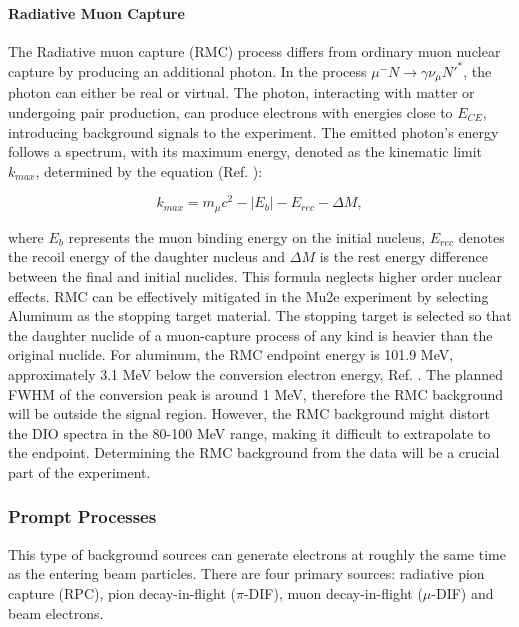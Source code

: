 \paragraph{Radiative Muon Capture}

The Radiative muon capture (RMC) process differs from ordinary muon nuclear capture by producing an additional photon. In the process $\mu^- N \rightarrow\gamma \nu_\mu N'^* $, the photon can either be real or virtual. The photon, interacting with matter or undergoing pair production, can produce electrons with energies close to $E_{CE}$, introducing background signals to the experiment. The emitted photon's energy follows a spectrum, with its maximum energy, denoted as the kinematic limit $k_{max}$, determined by the equation (Ref. \cite{bartoszek2015mu2e}):

\begin{equation}
k_{max} = m_\mu c^2 - |E_b| - E_{rec} - \Delta M ,
\end{equation}

where $E_b$ represents the muon binding energy on the initial nucleus, $E_{rec}$ denotes the recoil energy of the daughter nucleus and $\Delta M$ is the rest energy difference between the final and initial nuclides. This formula neglects higher order nuclear effects. RMC can be effectively mitigated in the Mu2e experiment by selecting Aluminum as the stopping target material. The stopping target is selected so that the daughter nuclide of a muon-capture process of any kind is heavier than the original nuclide. For aluminum, the RMC endpoint energy is 101.9 MeV, approximately 3.1 MeV below the conversion electron energy, Ref. \cite{bartoszek2015mu2e}. The planned FWHM of the conversion peak is around 1 MeV, therefore the RMC background will be outside the signal region. However, the RMC background might distort the DIO spectra in the 80-100 MeV range, making it difficult to extrapolate to the endpoint. Determining the RMC background from the data will be a crucial part of the experiment.
\subsubsection{Prompt Processes}
This type of background sources can generate electrons at roughly the same time as the entering beam particles. There are four primary sources: radiative pion capture (RPC), pion decay-in-flight ($\pi$-DIF), muon decay-in-flight ($\mu$-DIF) and beam electrons.
